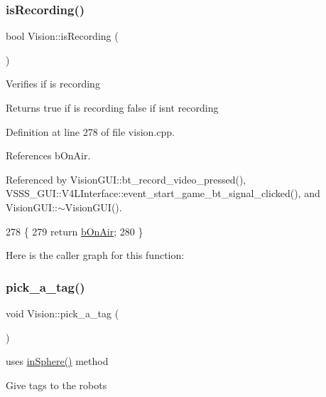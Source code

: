 \subsubsection{\texorpdfstring{is\+Recording()}{isRecording()}}
{\footnotesize\ttfamily bool Vision\+::is\+Recording (\begin{DoxyParamCaption}{ }\end{DoxyParamCaption})}

Verifies if is recording

\begin{DoxyReturn}{Returns}
true if is recording false if isn\textquotesingle{}t recording 
\end{DoxyReturn}


Definition at line 278 of file vision.\+cpp.



References b\+On\+Air.



Referenced by Vision\+G\+U\+I\+::bt\+\_\+record\+\_\+video\+\_\+pressed(), V\+S\+S\+S\+\_\+\+G\+U\+I\+::\+V4\+L\+Interface\+::event\+\_\+start\+\_\+game\+\_\+bt\+\_\+signal\+\_\+clicked(), and Vision\+G\+U\+I\+::$\sim$\+Vision\+G\+U\+I().


\begin{DoxyCode}
278                          \{
279     \textcolor{keywordflow}{return} \hyperlink{class_vision_a1eb56f5e3433ca3dce53fe315b845979}{bOnAir};
280 \}
\end{DoxyCode}
Here is the caller graph for this function\+:
\mbox{\label{class_vision_ada61d6f3bfc003a8e0e49bb5ee3516a3}} 
\subsubsection{\texorpdfstring{pick\+\_\+a\+\_\+tag()}{pick\_a\_tag()}}
{\footnotesize\ttfamily void Vision\+::pick\+\_\+a\+\_\+tag (\begin{DoxyParamCaption}{ }\end{DoxyParamCaption})\hspace{0.3cm}{\ttfamily [private]}}



uses \hyperlink{class_vision_a52fc530a0beea6bc8821cb83c5ae2cc5}{in\+Sphere()} method 

Give tags to the robots 

